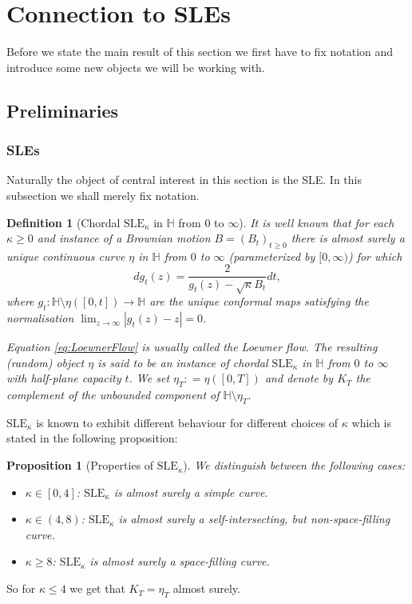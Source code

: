 \documentclass[11pt,reqno]{amsart}
\numberwithin{equation}{section}
\newtheorem{pro}[thm]{Proposition}
\newtheorem{defi}[thm]{Definition}
\newcommand{\deq}{\mathrel{\mathop:}=}
\begin{document}
\section{Connection to SLEs}
Before we state the main result of this section we first have to fix notation and introduce some new objects we will be working with.
\subsection{Preliminaries}

\subsubsection{SLEs}
Naturally the object of central interest in this section is the SLE. In this subsection we shall merely fix notation.

\begin{defi}[Chordal $\text{SLE}_\kappa$ in $\mathbb H$ from $0$ to $\infty$]
	It is well known that for each $\kappa\geq 0$ and instance of a Brownian motion $B=(B_t)_{t\geq 0}$ there is almost surely a unique continuous curve $\eta$ in $\mathbb H$ from $0$ to $\infty$ (parameterized by $[0,\infty)$) for which
	\begin{equation}\label{eq:LoewnerFlow}
		dg_t(z)=\frac{2}{g_t(z)-\sqrt\kappa B_t}dt,
	\end{equation}
where $g_t:\mathbb H\setminus\eta([0,t])\rightarrow\mathbb H$ are the unique conformal maps satisfying the normalisation $\lim_{z\rightarrow\infty}|g_t(z)-z|=0$.

Equation \eqref{eq:LoewnerFlow} is usually called the Loewner flow. 
The resulting (random) object $\eta$ is said to be an instance of chordal $\text{SLE}_\kappa$ in $\mathbb H$ from $0$ to $\infty$ with half-plane capacity $t$.
We set $\eta_T\deq\eta([0,T])$ and denote by $K_T$ the complement of the unbounded component of $\mathbb H\setminus\eta_T$.
\end{defi}
$\text{SLE}_\kappa$ is known to exhibit different behaviour for different choices of $\kappa$ which is stated in the following proposition:
\begin{pro}[Properties of $\text{SLE}_\kappa$] We distinguish between the following cases:
	\begin{itemize}
		\item $\kappa\in[0,4]$: $\text{SLE}_\kappa$ is almost surely a simple curve.
		\item $\kappa\in(4,8)$: $\text{SLE}_\kappa$ is almost surely a self-intersecting, but non-space-filling curve.
		\item $\kappa\geq 8$: $\text{SLE}_\kappa$ is almost surely a space-filling curve.
	\end{itemize}
\end{pro}
So for $\kappa\leq 4$ we get that $K_T=\eta_T$ almost surely.
\end{document}
